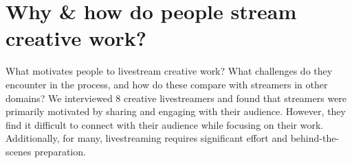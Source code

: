 \section{Why \& how do people stream creative work?}
What motivates people to livestream creative work? What challenges do they encounter in the process, and how do these compare with streamers in other domains? We interviewed 8 creative livestreamers and found that streamers were primarily motivated by sharing and engaging with their audience. However, they find it difficult to connect with their audience while focusing on their work. Additionally, for many, livestreaming requires significant effort and behind-the-scenes preparation. 


